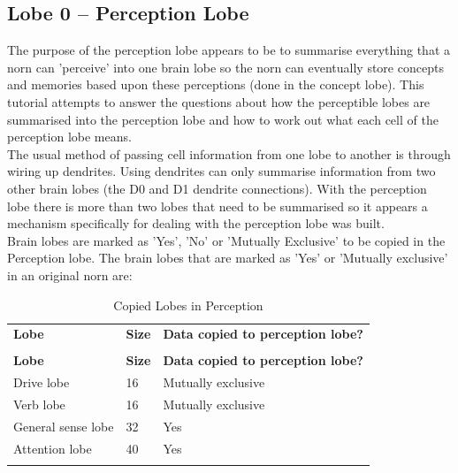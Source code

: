 \documentclass[11pt,twoside,a4paper]{article}
\begin{document}

\subsection{Lobe 0 -- Perception Lobe}


The purpose of the perception lobe appears to be to summarise everything that a norn can 'perceive' into one brain lobe so the norn can eventually store concepts and memories based upon these perceptions (done in the concept lobe). This tutorial attempts to answer the questions about how the perceptible lobes are summarised into the perception lobe and how to work out what each cell of the perception lobe means.~\\

The usual method of passing cell information from one lobe to another is through wiring up dendrites. Using dendrites can only summarise information from two other brain lobes (the D0 and D1 dendrite connections). With the perception lobe there is more than two lobes that need to be summarised so it appears a mechanism specifically for dealing with the perception lobe was built.~\\

Brain lobes are marked as 'Yes', 'No' or 'Mutually Exclusive' to be copied in the Perception lobe. The brain lobes that are marked as 'Yes' or 'Mutually exclusive' in an original norn are:
\begin{longtable}{|p{}|p{}|p{}|}
	\hline \rowcolor[gray]{0.50} \multicolumn{3}{|c|}{Copied Lobes in Perception} \\
	\hline \rowcolor[gray]{0.75} \textbf{Lobe} & \textbf{Size} & \textbf{Data copied to perception lobe?} \\ \hline
	\endfirsthead
	\hline \rowcolor[gray]{0.50} \multicolumn{3}{|c|}{Copied Lobes in Perception} \\
	\hline \rowcolor[gray]{0.75} \textbf{Lobe} & \textbf{Size} & \textbf{Data copied to perception lobe?} \\ \hline
	\endhead
	\hline 
	\endfoot
	Drive lobe		&	16 &	Mutually exclusive \\ \hline
	Verb lobe		&	16 &	Mutually exclusive \\ \hline
	General sense lobe	&	32 &	Yes \\ \hline
	Attention lobe 		&	40 &	Yes \\ \hline
	\caption{Copied Lobes in Perception}
	\label{tab:Copied_Lobes_in_Perception}\\
\end{longtable}
\end{document}
